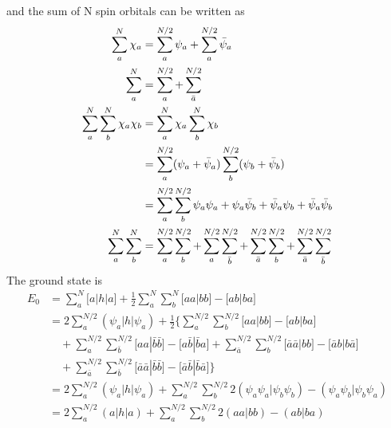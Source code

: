 \documentclass[11pt]{article}
\begin{document}
and the sum of N spin orbitals can be written as 
\begin{align}
    \sum_{a}^{N}\chi_a&=\sum_{a}^{N/2}\psi_a+\sum_{a}^{N/2}\bar{\psi}_a\\
    \sum_{a}^{N}&=\sum_{a}^{N/2}+\sum_{\bar{a}}^{N/2}\\
    \sum_{a}^{N}\sum_{b}^{N}\chi_a\chi_b&=\sum_{a}^{N}\chi_a\sum_{b}^{N}\chi_b \notag\\
    &=\sum_{a}^{N/2}(\psi_a+\bar{\psi}_a)\sum_{b}^{N/2}(\psi_b+\bar{\psi}_b)\notag\\
    &=\sum_{a}^{N/2}\sum_{b}^{N/2}\psi_a\psi_a+\psi_a\bar{\psi}_b+\bar{\psi}_a\psi_b+\bar{\psi}_a\bar{\psi}_b\\
    \sum_{a}^{N}\sum_{b}^{N}&=\sum_{a}^{N/2}\sum_{b}^{N/2}+\sum_{a}^{N/2}\sum_{\bar{b}}^{N/2}+\sum_{\bar{a}}^{N/2}\sum_{b}^{N/2}+\sum_{\bar{a}}^{N/2}\sum_{\bar{b}}^{N/2}
\end{align}
The ground state is
\begin{equation}
    \begin{split}
        E_0&=\sum_{a}^{N}\big[a|h|a\big]+\frac{1}{2}\sum_{a}^{N}\sum_{b}^{N}\big[aa|bb\big]-\big[ab|ba\big]\\
        &=2\sum_{a}^{N/2}(\psi_a|h|\psi_a)+\frac{1}{2}\biggl\{\sum_{a}^{N/2}\sum_{b}^{N/2}\big[aa|bb]-\big[ab|ba]\\
        &\quad +\sum_{a}^{N/2}\sum_{\bar{b}}^{N/2}\big[aa|\bar{b}\bar{b}]-\big[a\bar{b}|\bar{b}a]+\sum_{\bar{a}}^{N/2}\sum_{b}^{N/2}\big[\bar{a}\bar{a}|bb\big]-\big[\bar{a}b|b\bar{a}\big]\\
        &\quad +\sum_{\bar{a}}^{N/2}\sum_{\bar{b}}^{N/2}\big[\bar{a}\bar{a}|\bar{b}\bar{b}\big]-\big[\bar{a}\bar{b}|\bar{b}\bar{a}\big]\biggr\}\\
        &=2\sum_{a}^{N/2}(\psi_a|h|\psi_a)+\sum_{a}^{N/2}\sum_{b}^{N/2}2(\psi_a\psi_a|\psi_b\psi_b)-(\psi_a\psi_b|\psi_b\psi_a)\\
        &=2\sum_{a}^{N/2}(a|h|a)+\sum_{a}^{N/2}\sum_{b}^{N/2}2(aa|bb)-(ab|ba)
    \end{split}
\end{equation}
\end{document}
